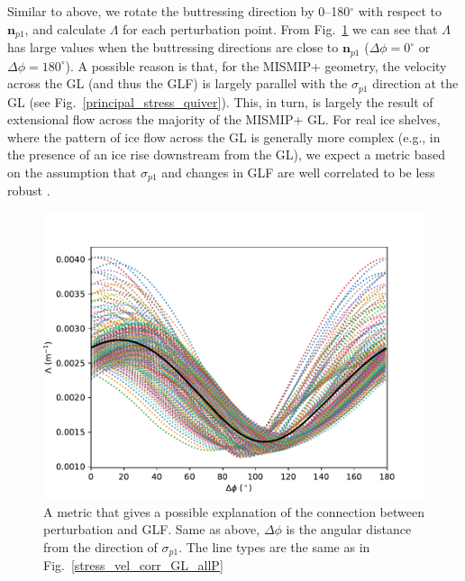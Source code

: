 \documentclass[review,oneside]{igs}
\begin{document}
Similar to above, we rotate the buttressing direction by 0--180$^\circ$ with respect to $\mathbf{n}_{p1}$, and calculate $\Lambda$ for each perturbation point. From Fig.~\ref{new_metric_new} we can see that $\Lambda$ has large values when the buttressing directions are close to $\mathbf{n}_{p1}$ ($\Delta\phi=0^\circ$ or $\Delta\phi=180^\circ$). A possible reason is that, for the MISMIP+ geometry, the velocity across the GL (and thus the GLF) is largely parallel with the $\sigma_{p1}$ direction at the GL (see Fig.~\ref{principal_stress_quiver}). This, in turn, is largely the result of extensional flow across the majority of the MISMIP+ GL.
For real ice shelves, where the pattern of ice flow across the GL is generally more complex (e.g., in the presence of an ice rise downstream from the GL), we expect a metric based on the assumption that $\sigma_{p1}$ and changes in GLF are well correlated to be less robust
.  


\begin{figure}
	\centering
    \includegraphics[width=1\linewidth]{figs/new_metric_new.pdf}
    \caption{A metric that gives a possible explanation of the connection between perturbation and GLF. Same as above, $\Delta\phi$ is the angular distance from the direction of $\sigma_{p1}$. The line types are the same as in Fig.~\ref{stress_vel_corr_GL_allP}}
	\label{new_metric_new}
\end{figure}
\end{document}
